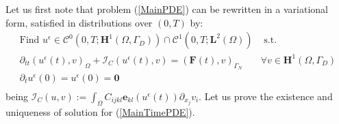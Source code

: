 Let us first note that problem (\ref{MainPDE}) can be rewritten in a variational form, satisfied in distributions over $(0,T)$ by: 
\begin{equation}
    \label{MainTimePDE}
    \begin{array}{cc}
        \text{Find } u^{\epsilon} \in \mathcal{C}^0 (0,T;\mathbf{H}^1(\Omega,\Gamma_D)) \cap \mathcal{C}^1(0,T;\mathbf{L}^2(\Omega)) & \text{ s.t. }\\
        \partial_{tt} (u^{\epsilon}(t),v)_{\Omega} + \mathcal{I}_{C}(u^{\epsilon}(t),v) = (\mathbf{F}(t),v)_{\Gamma_N}&  \forall v \in \mathbf{H}^1(\Omega,\Gamma_D) \\
        \partial_{t} u^{\epsilon}(0) = u^{\epsilon}(0) = \mathbf{0} & \\
    \end{array}
\end{equation}
being $\mathcal{I}_{C}(u,v) := \int_{\Omega} C_{ijkl}\mathbf{e}_{kl}(u^{\epsilon}(t)) \partial_{x_j} v_i$.
Let us prove the existence and uniqueness of solution for (\ref{MainTimePDE}).
